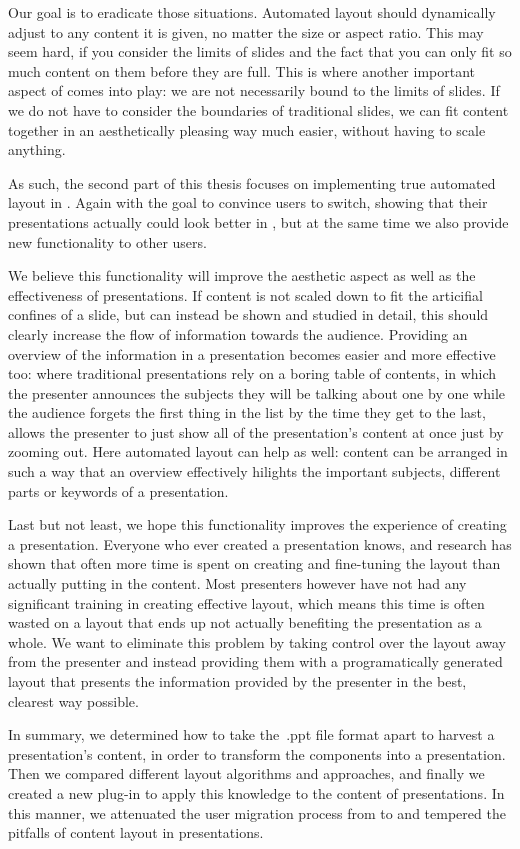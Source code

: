   Our goal is to eradicate those situations. Automated layout should
  dynamically adjust to any content it is given, no matter the size or aspect
  ratio. This may seem hard, if you consider the limits of slides and the fact
  that you can only fit so much content on them before they are full. This is
  where another important aspect of \mxp comes into play: we are not
  necessarily bound to the limits of slides. If we do not have to consider the
  boundaries of traditional slides, we can fit content together in an
  aesthetically pleasing way much easier, without having to scale anything.

  As such, the second part of this thesis focuses on implementing true
  automated layout in \mxp. Again with the goal to convince \ppt* users to
  switch, showing that their presentations actually could look better in \mxp,
  but at the same time we also provide new functionality to other \mxp users.

  We believe this functionality will improve the aesthetic aspect as well as
  the effectiveness of presentations. If content is not scaled down to fit the
  articifial confines of a slide, but can instead be shown and studied in
  detail, this should clearly increase the flow of information towards the
  audience. Providing an overview of the information in a presentation becomes
  easier and more effective too: where traditional presentations rely on a
  boring table of contents, in which the presenter announces the subjects
  they will be talking about one by one while the audience forgets the first
  thing in the list by the time they get to the last, \mxp allows the presenter
  to just show all of the presentation's content at once just by zooming out.
  Here automated layout can help as well: content can be arranged in such a way
  that an overview effectively hilights the important subjects, different parts
  or keywords of a presentation.

  Last but not least, we hope this functionality improves the experience of
  creating a presentation. Everyone who ever created a presentation knows, and
  research has shown \citep{lok-1} that often more time is spent on creating
  and fine-tuning the layout than actually putting in the content. Most
  presenters however have not had any significant training in creating
  effective layout, which means this time is often wasted on a layout that ends
  up not actually benefiting the presentation as a whole. We want to eliminate
  this problem by taking control over the layout away from the presenter and
  instead providing them with a programatically generated layout that presents
  the information provided by the presenter in the best, clearest way possible.

  In summary, we determined how to take the\ .ppt file format apart to harvest
  a \ppt presentation's content, in order to transform the components into a
  \mxp presentation. Then we compared different layout algorithms and
  approaches, and finally we created a new \mxp plug-in to apply this knowledge
  to the content of \mxp presentations. In this manner, we attenuated the user
  migration process from \ppt to \mxp and tempered the pitfalls of content
  layout in presentations.
